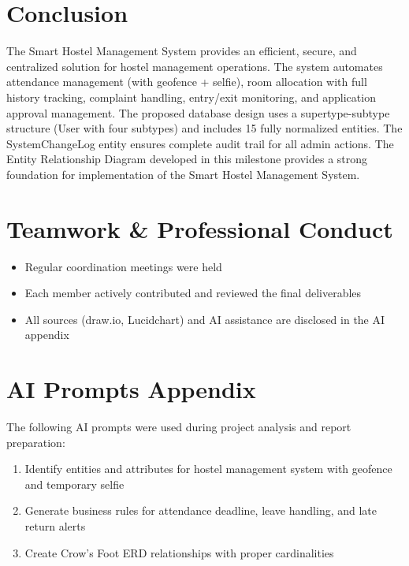 \documentclass[12pt,a4paper]{article}
\begin{document}

\section{Conclusion}

The Smart Hostel Management System provides an efficient, secure, and centralized solution for hostel management operations. The system automates attendance management (with geofence + selfie), room allocation with full history tracking, complaint handling, entry/exit monitoring, and application approval management. The proposed database design uses a supertype-subtype structure (User with four subtypes) and includes 15 fully normalized entities. The SystemChangeLog entity ensures complete audit trail for all admin actions. The Entity Relationship Diagram developed in this milestone provides a strong foundation for implementation of the Smart Hostel Management System.

\section{Teamwork \& Professional Conduct}

\begin{itemize}
   
    \item Regular coordination meetings were held
    \item Each member actively contributed and reviewed the final deliverables
    \item All sources (draw.io, Lucidchart) and AI assistance are disclosed in the AI appendix
\end{itemize}

\section{AI Prompts Appendix}

The following AI prompts were used during project analysis and report preparation:

\begin{enumerate}
    \item Identify entities and attributes for hostel management system with geofence and temporary selfie 
    \item Generate business rules for attendance deadline, leave handling, and late return alerts
    \item Create Crow's Foot ERD relationships with proper cardinalities
\end{enumerate}
\end{document}
